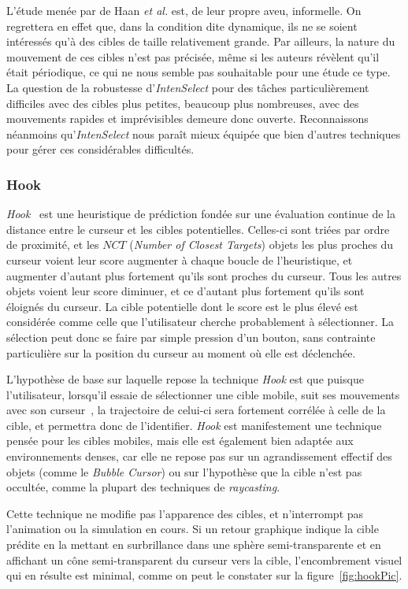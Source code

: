 	L'étude menée par de Haan \emph{et al.} est, de leur propre aveu, informelle. On regrettera en effet que, dans la condition dite dynamique, ils ne se soient intéressés qu'à des cibles de taille relativement grande. Par ailleurs, la nature du mouvement de ces cibles n'est pas précisée, même si les auteurs révèlent qu'il était périodique, ce qui ne nous semble pas souhaitable pour une étude ce type. La question de la robustesse d'\emph{IntenSelect} pour des tâches particulièrement difficiles avec des cibles plus petites, beaucoup plus nombreuses, avec des mouvements rapides et imprévisibles demeure donc ouverte. Reconnaissons néanmoins qu'\emph{IntenSelect} nous paraît mieux équipée que bien d'autres techniques pour gérer ces considérables difficultés.
		
	\subsubsection{Hook}
	\label{sub:hook}
	\emph{Hook}~\cite{ortega2013hook} est une heuristique de prédiction fondée sur une évaluation continue de la distance entre le curseur et les cibles potentielles. Celles-ci sont triées par ordre de proximité, et les $NCT$ (\emph{Number of Closest Targets}) objets les plus proches du curseur voient leur score augmenter à chaque boucle de l'heuristique, et augmenter d'autant plus fortement qu'ils sont proches du curseur. Tous les autres objets voient leur score diminuer, et ce d'autant plus fortement qu'ils sont éloignés du curseur. La cible potentielle dont le score est le plus élevé est considérée comme celle que l'utilisateur cherche probablement à sélectionner. La sélection peut donc se faire par simple pression d'un bouton, sans contrainte particulière sur la position du curseur au moment où elle est déclenchée.

	L'hypothèse de base sur laquelle repose la technique \emph{Hook} est que puisque l'utilisateur, lorsqu'il essaie de sélectionner une cible mobile, \og suit \fg{} ses mouvements avec son curseur~\cite{hasan2011comet}, la trajectoire de celui-ci sera fortement corrélée à celle de la cible, et permettra donc de l'identifier. \emph{Hook} est manifestement une technique pensée pour les cibles mobiles, mais elle est également bien adaptée aux environnements denses, car elle ne repose pas sur un agrandissement effectif des objets (comme le \emph{Bubble Cursor}) ou sur l'hypothèse que la cible n'est pas occultée, comme la plupart des techniques de \emph{raycasting}.
	
	Cette technique ne modifie pas l'apparence des cibles, et n'interrompt pas l'animation ou la simulation en cours. Si un retour graphique indique la cible prédite en la mettant en surbrillance dans une sphère semi-transparente et en affichant un cône semi-transparent du curseur vers la cible, l'encombrement visuel qui en résulte est minimal, comme on peut le constater sur la figure~\ref{fig:hookPic}.
	
